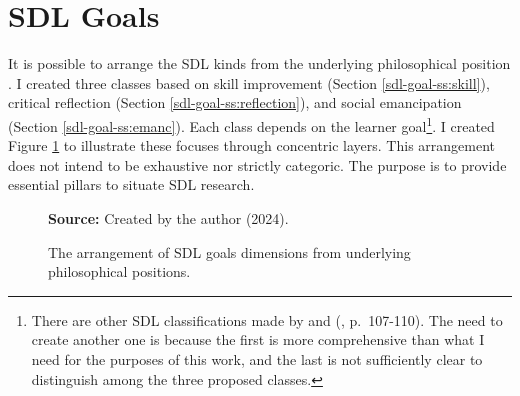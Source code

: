 \section{SDL Goals}
\label{sdl-sec:goals}

It is possible to arrange the \gls{SDL} kinds from the underlying philosophical position \cite[p.~206]{caffarella:1987}. I created three classes based on skill improvement (Section \ref{sdl-goal-ss:skill}), critical reflection (Section \ref{sdl-goal-ss:reflection}), and social emancipation (Section \ref{sdl-goal-ss:emanc}). Each class depends on the learner goal\footnote{There are other SDL classifications made by  and  (\citeyear{merriam:2007}, p.~107-110). The need to create another one is because the first is more comprehensive than what I need for the purposes of this work, and the last is not sufficiently clear to distinguish among the three proposed classes.}. I created Figure \ref{fig:sdl-goals} to illustrate these focuses through concentric layers. This arrangement does not intend to be exhaustive nor strictly categoric. The purpose is to provide essential pillars to situate \gls{SDL} research.

\begin{figure}[ht!]
\centering

\caption{\textmd{The arrangement of \acrshort{SDL} goals dimensions from underlying philosophical positions.}}
\label{fig:sdl-goals}

\par\medskip\ABNTEXfontereduzida\selectfont\textbf{Source:} Created by the author (2024).
\end{figure}

